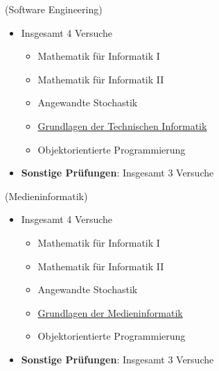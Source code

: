 \documentclass[
	aspectratio=169, 
	8pt 
]{beamer}
\begin{document}
\begin{frame}{\insertsubsection \space (Software Engineering)}
    \begin{itemize}
        \item Insgesamt 4 Versuche \footnotemark[1] \begin{itemize} 
            \item Mathematik für Informatik I
            \item Mathematik für Informatik II
            \item Angewandte Stochastik
            \item \underline{Grundlagen der Technischen Informatik}
            \item Objektorientierte Programmierung \end{itemize}
        \item \textbf{Sonstige Prüfungen}: Insgesamt 3 Versuche
    \end{itemize}

\end{frame}

\begin{frame}{\insertsubsection \space (Medieninformatik)}
    \begin{itemize}
        \item Insgesamt 4 Versuche \footnotemark[1] \begin{itemize} 
            \item Mathematik für Informatik I
            \item Mathematik für Informatik II
            \item Angewandte Stochastik
            \item \underline{Grundlagen der Medieninformatik}
            \item Objektorientierte Programmierung \end{itemize}
        \item \textbf{Sonstige Prüfungen}: Insgesamt 3 Versuche
    \end{itemize}

\end{frame}
\end{document}
